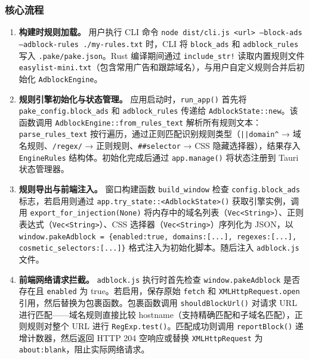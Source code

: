 \documentclass[12pt,a4paper]{ctexart}
\begin{document}
\subsubsection{核心流程}

\begin{sloppypar}
\begin{enumerate}[label=(\arabic*)]
  \item \textbf{构建时规则加载。}
    用户执行 CLI 命令 \texttt{node dist/cli.js <url> --block-ads --adblock-rules ./my-rules.txt} 时，CLI 将 \texttt{block\_ads} 和 \texttt{adblock\_rules} 写入 \texttt{.pake/pake.json}。Rust 编译期间通过 \texttt{include\_str!} 读取内置规则文件 \texttt{easylist-mini.txt}（包含常用广告和跟踪域名），与用户自定义规则合并后初始化 \texttt{AdblockEngine}。

  \item \textbf{规则引擎初始化与状态管理。}
    应用启动时，\texttt{run\_app()} 首先将 \texttt{pake\_config.block\_ads} 和 \texttt{adblock\_rules} 传递给 \texttt{AdblockState::new}。该函数调用 \texttt{AdblockEngine::from\_rules\_text} 解析所有规则文本：\texttt{parse\_rules\_text} 按行遍历，通过正则匹配识别规则类型（\texttt{||domain\textasciicircum} → 域名规则、\texttt{/regex/} → 正则规则、\texttt{\#\#selector} → CSS 隐藏选择器），结果存入 \texttt{EngineRules} 结构体。初始化完成后通过 \texttt{app.manage()} 将状态注册到 Tauri 状态管理器。

  \item \textbf{规则导出与前端注入。}
    窗口构建函数 \texttt{build\_window} 检查 \texttt{config.block\_ads} 标志，若启用则通过 \texttt{app.try\_state::<AdblockState>()} 获取引擎实例，调用 \texttt{export\_for\_injection(None)} 将内存中的域名列表（\texttt{Vec<String>}）、正则表达式（\texttt{Vec<String>}）、CSS 选择器（\texttt{Vec<String>}）序列化为 JSON，以 \texttt{window.pakeAdblock = \{enabled:true, domains:[...], regexes:[...], cosmetic\_selectors:[...]\}} 格式注入为初始化脚本。随后注入 \texttt{adblock.js} 文件。

  \item \textbf{前端网络请求拦截。}
    \texttt{adblock.js} 执行时首先检查 \texttt{window.pakeAdblock} 是否存在且 \texttt{enabled} 为 true。若启用，保存原始 \texttt{fetch} 和 \texttt{XMLHttpRequest.open} 引用，然后替换为包裹函数。包裹函数调用 \texttt{shouldBlockUrl()} 对请求 URL 进行匹配——域名规则直接比较 hostname（支持精确匹配和子域名匹配），正则规则对整个 URL 进行 \texttt{RegExp.test()}。匹配成功则调用 \texttt{reportBlock()} 递增计数器，然后返回 HTTP 204 空响应或替换 \texttt{XMLHttpRequest} 为 \texttt{about:blank}，阻止实际网络请求。


\end{enumerate}
\end{sloppypar}
\end{document}
